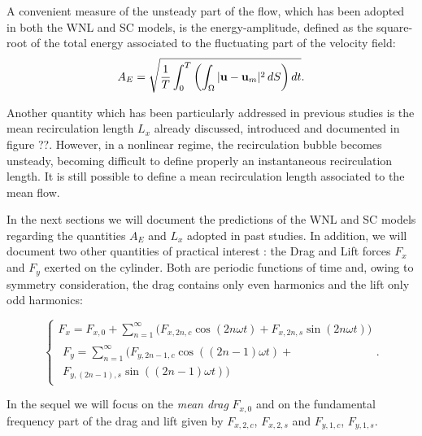 \documentclass[twocolumn,10pt]{asme2ej}
\newcommand{\be}[1]{ \begin{equation} \label{#1}}
\newcommand{\ee}{\end{equation}}
\begin{document}
A convenient measure of the unsteady part of the flow, which has been adopted in both the WNL and SC models, is the energy-amplitude, defined as the square-root of the total energy associated to the fluctuating part of the velocity field:
\be{defAnergy}
A_E = \sqrt{\frac{1}{T} \int_0^{T} \left( \int_\Omega | {\bf u} - {\bf u}_m |^2 \, dS \right) dt}.
\ee

Another quantity which has been particularly addressed in previous studies is the mean recirculation length $L_x$
already discussed{\color{red},} introduced and documented in figure {\color{red}??}. {\color{red} However, in a} nonlinear regime, the recirculation bubble becomes unsteady, {\color{red} becoming} difficult to define properly an instantaneous recirculation length. It is still possible to define a mean recirculation length associated to the mean flow. %

In the next sections we will document the predictions of the WNL and SC models regarding the quantities $A_E$ and $L_x$ adopted in past studies. In addition, we will document two other quantities of practical interest : the Drag and Lift forces $F_x$ and $F_y$ exerted on the cylinder. 
Both are periodic functions of time and{\color{red},} owing to symmetry consideration, the drag contains only even harmonics and the lift only odd harmonics:{\color{red}
\be{drag_lift_def}
\begin{cases}
F_x=F_{x,0} + \sum_{n=1}^\infty \big( F_{x,2n,c} \cos ( 2 n \omega t) + F_{x,2n,s} \sin( 2 n  \omega t ) \big) \\
\begin{split}
F_y  =  \sum_{n=1}^\infty \big(  F_{y,{2n-1},c} \cos ((2n-1) \omega t ) +\\
 F_{y,(2n-1),s} \sin ((2n-1) \omega t) \big)
\end{split}
\end{cases}.
\ee


In the sequel we will focus on the {\em mean drag}  $F_{x,0}$ and on the fundamental frequency part of the drag and lift given by $F_{x,2,c}$, $F_{x,2,s}$ and $F_{y,1,c}$, $F_{y,1,s}$.
 }
   


\end{document}
